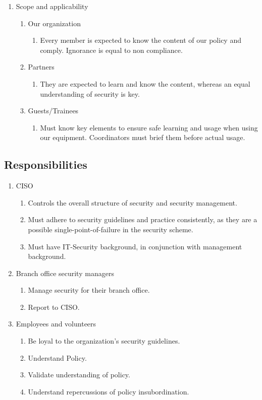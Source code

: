 \begin{enumerate}
  \item Scope and applicability
  \begin{enumerate}
    \item Our organization
      \begin{enumerate}
        \item Every member is expected to know the content of our policy and comply. Ignorance is equal to non compliance.
      \end{enumerate}
        \item Partners
      \begin{enumerate}
        \item They are expected to learn and know the content, whereas an equal understanding of security is key.
      \end{enumerate}
        \item Guests/Trainees
      \begin{enumerate}
        \item Must know key elements to ensure safe learning and usage when using our equipment. Coordinators must brief them before actual usage.
      \end{enumerate}
  \end{enumerate}
\end{enumerate}

\subsection{Responsibilities}

\begin{enumerate}
  \item CISO 
  \begin{enumerate}
    \item Controls the overall structure of security and security management.
    \item Must adhere to security guidelines and practice consistently, as they are a possible single-point-of-failure in the security scheme.
    \item Must have IT-Security background, in conjunction with management background.
  \end{enumerate}
  \item Branch office security managers
  \begin{enumerate}
     \item Manage security for their branch office.
     \item Report to CISO.
  \end{enumerate}
  \item Employees and volunteers
  \begin{enumerate}
    \item Be loyal to the organization's security guidelines.
    \item Understand Policy.
    \item Validate understanding of policy.
    \item Understand repercussions of policy insubordination.
  \end{enumerate}
\end{enumerate}

